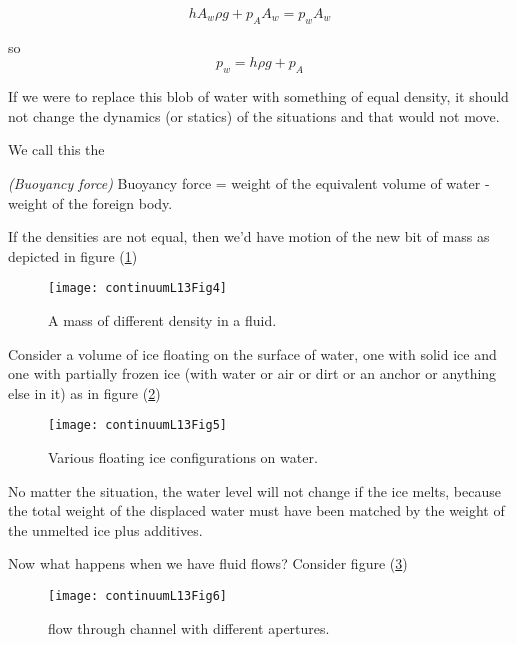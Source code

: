 \begin{equation}\label{eqn:continuumL13:20}
h A_w \rho g + p_A A_w = p_w A_w
\end{equation}

so
\begin{equation}\label{eqn:continuumL13:40}
p_w = h \rho g + p_A
\end{equation}

If we were to replace this blob of water with something of equal density, it should not change the dynamics (or statics) of the situations and that would not move.

We call this the

\begin{definition}
\emph{(Buoyancy force)}
\label{dfn:continuumL13:60}
Buoyancy force = 
weight of the equivalent volume of water - weight of the foreign body.
\end{definition}

If the densities are not equal, then we'd have motion of the new bit of mass as depicted in figure (\ref{fig:continuumL13:continuumL13Fig4})
\begin{figure}[htp]
   \centering
   \texttt{[image: continuumL13Fig4]}
   \caption{A mass of different density in a fluid.}\label{fig:continuumL13:continuumL13Fig4}
\end{figure}

Consider a volume of ice floating on the surface of water, one with solid ice and one with partially frozen ice (with water or air or dirt or an anchor or anything else in it) as in figure (\ref{fig:continuumL13:continuumL13Fig5})

\begin{figure}[htp]
   \centering
   \texttt{[image: continuumL13Fig5]}
   \caption{Various floating ice configurations on water.}\label{fig:continuumL13:continuumL13Fig5}
\end{figure}

No matter the situation, the water level will not change if the ice melts, because the total weight of the displaced water must have been matched by the weight of the unmelted ice plus additives.

Now what happens when we have fluid flows?  Consider figure (\ref{fig:continuumL13:continuumL13Fig6})
\begin{figure}[htp]
   \centering
   \texttt{[image: continuumL13Fig6]}
   \caption{flow through channel with different apertures.}\label{fig:continuumL13:continuumL13Fig6}
\end{figure}

